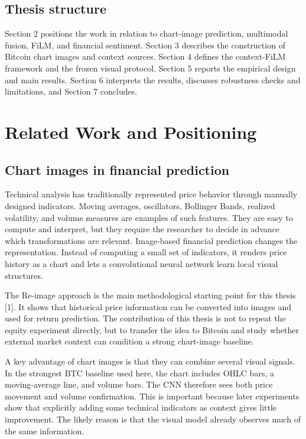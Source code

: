 \documentclass[14pt,a4paper]{extarticle}
\begin{document}
\subsection{Thesis structure}

Section 2 positions the work in relation to chart-image prediction, multimodal fusion, FiLM, and financial sentiment. Section 3 describes the construction of Bitcoin chart images and context sources. Section 4 defines the context-FiLM framework and the frozen visual protocol. Section 5 reports the empirical design and main results. Section 6 interprets the results, discusses robustness checks and limitations, and Section 7 concludes.

\clearpage

\section{Related Work and Positioning}

\subsection{Chart images in financial prediction}

Technical analysis has traditionally represented price behavior through manually designed indicators. Moving averages, oscillators, Bollinger Bands, realized volatility, and volume measures are examples of such features. They are easy to compute and interpret, but they require the researcher to decide in advance which transformations are relevant. Image-based financial prediction changes the representation. Instead of computing a small set of indicators, it renders price history as a chart and lets a convolutional neural network learn local visual structures.

The Re-image approach is the main methodological starting point for this thesis [1]. It shows that historical price information can be converted into images and used for return prediction. The contribution of this thesis is not to repeat the equity experiment directly, but to transfer the idea to Bitcoin and study whether external market context can condition a strong chart-image baseline.

A key advantage of chart images is that they can combine several visual signals. In the strongest BTC baseline used here, the chart includes OHLC bars, a moving-average line, and volume bars. The CNN therefore sees both price movement and volume confirmation. This is important because later experiments show that explicitly adding some technical indicators as context gives little improvement. The likely reason is that the visual model already observes much of the same information.
\end{document}
